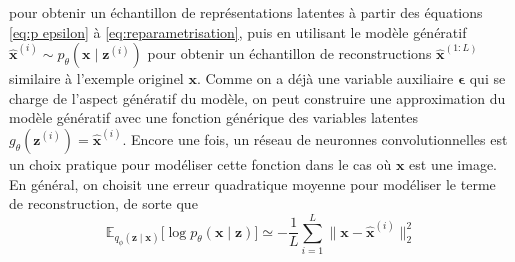 pour obtenir un échantillon de représentations latentes à partir des équations \eqref{eq:p epsilon} à \eqref{eq:reparametrisation}, 
puis en utilisant le modèle génératif $\hat{\mathbf{x}}^{(i)} \sim p_\theta(\mathbf{x} \mid \mathbf{z}^{(i)})$ pour obtenir 
un échantillon de reconstructions $\mathbf{\hat{x}}^{(1:L)}$ similaire à l'exemple originel $\mathbf{\mathbf{x}}$. 
Comme on a déjà une variable auxiliaire $\boldsymbol{ \epsilon} $ 
qui se charge de l'aspect génératif du modèle, on peut construire une approximation du 
modèle génératif avec une fonction générique des variables latentes 
$g_\theta(\mathbf{z}^{(i)}) = \hat{\mathbf{x}}^{(i)}$. Encore une fois, un réseau de neuronnes convolutionnelles est un choix pratique pour modéliser cette fonction 
dans le cas où $\mathbf{x}$ est une image. En général, on choisit une erreur quadratique moyenne pour modéliser le terme de reconstruction, 
de sorte que
\begin{equation}\label{eq:reconstruction}
        \mathbb{E}_{q_\phi(\mathbf{z} \mid \mathbf{x})} \bigg[
                \log p_\theta(\mathbf{x} \mid \mathbf{z})
        \bigg] 
        \simeq -\frac{1}{L}\sum_{i=1}^{L} \lVert \mathbf{x} - \hat{\mathbf{x}}^{(i)} \rVert_2^{2}
\end{equation} 

